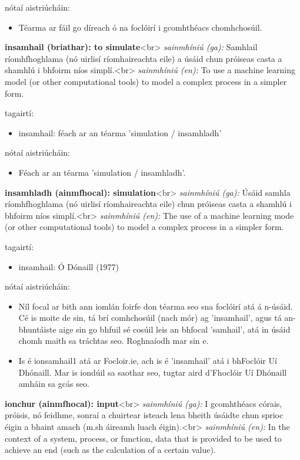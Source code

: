 \documentclass{article}
\begin{document}
nótaí aistriúcháin:
\begin{itemize}
	\item Téarma ar fáil go díreach ó na foclóirí i gcomhthéacs chomhchosúil.
\end{itemize}


\textbf{insamhail (briathar): to simulate}<br>
\textit{sainmhíniú (ga):} Samhlail ríomhfhoghlama (nó uirlisí ríomhaireachta eile) a úsáid chun próiseas casta a shamhlú i bhfoirm níos simplí.<br>
\textit{sainmhíniú (en):} To use a machine learning model (or other computational tools) to model a complex process in a simpler form.

tagairtí:
\begin{itemize}
	\item insamhail: féach ar an téarma 'simulation / insamhladh'
\end{itemize}

nótaí aistriúcháin:
\begin{itemize}
	\item Féach ar an téarma 'simulation / insamhladh'.
\end{itemize}


\textbf{insamhladh (ainmfhocal): simulation}<br>
\textit{sainmhíniú (ga):} Úsáid samhla ríomhfhoghlama (nó uirlisí ríomhaireachta eile) chun próiseas casta a shamhlú i bhfoirm níos simplí.<br>
\textit{sainmhíniú (en):} The use of a machine learning mode (or other computational tools) to model a complex process in a simpler form.

tagairtí:
\begin{itemize}
	\item insamhail: Ó Dónaill (1977) \cite{odonaill}
\end{itemize}

nótaí aistriúcháin:
\begin{itemize}
	\item Níl focal ar bith ann iomlán foirfe don téarma seo sna foclóirí atá á n-úsáid. Cé is moite de sin, tá brí comhchosúil (nach mór) ag 'insamhail', agus tá an-bhuntáiste aige sin go bhfuil sé cosúil leis an bhfocal 'samhail', atá in úsáid chomh maith sa tráchtas seo. Roghnaíodh mar sin e.
	\item Is é ionsamhail1 atá ar Focloir.ie, ach is é 'insamhail' atá i bhFoclóir Uí Dhónaill. Mar is iondúil sa saothar seo, tugtar aird d'Fhoclóir Uí Dhónaill amháin sa gcás seo.
\end{itemize}


\textbf{ionchur (ainmfhocal): input}<br>
\textit{sainmhíniú (ga):} I gcomhthéacs córais, próisis, nó feidhme, sonraí a chuirtear isteach lena bheith úsáidte chun sprioc éigin a bhaint amach (m.sh áireamh luach éigin).<br>
\textit{sainmhíniú (en):} In the context of a system, process, or function, data that is provided to be used to achieve an end (such as the calculation of a certain value).
\end{document}
